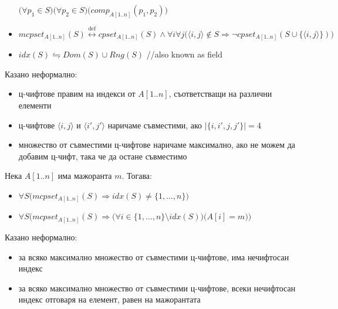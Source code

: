 \begin{solution}
\begin{boxlocaldefinition*}{}{}
\begin{itemize}
			\hspace{3.2cm}$\big(\forall p_1\in S\big)\big(\forall p_2\in S\big)\big(comp_{A[1..n]}(p_1,p_2)\big)$
			\item $mcpset_{A[1..n]}(S)\overset{\text{def}}\leftrightarrow cpset_{A[1..n]}(S)\land\forall i\forall j\big(\langle i,j\rangle\notin S\Rightarrow\lnot cpset_{A[1..n]}(S\cup\{\langle i,j\rangle\})\big)$
			\item $idx(S)\leftrightharpoons Dom(S)\cup Rng(S)$ //also known as field
		\end{itemize}
	\end{boxlocaldefinition*}
	\begin{remark*}
		Казано неформално:
		\begin{itemize}
			\item ц-чифтове правим на индекси от $A[1..n]$, съответстващи на различни елементи
			\item ц-чифтове $\langle i,j\rangle$ и $\langle i',j'\rangle$ наричаме съвместими, ако $|\{i,i',j,j'\}|=4$
			\item множество от съвместими ц-чифтове наричаме максимално, ако не можем да добавим ц-чифт, така че да остане съвместимо
		\end{itemize}
	\end{remark*}%
	\vspace{0.3cm}
	\begin{boxproposition}{}{}
		Нека $A[1..n]$ има мажоранта $m$. Тогава:
		\begin{itemize}
			\item $\forall S\big(mcpset_{A[1..n]}(S)\Rightarrow idx(S)\ne\{1,\dots,n\}\big)$
			\item $\forall S\Big(mcpset_{A[1..n]}(S)\Rightarrow\big(\forall i\!\in\!\{1,\dots,n\}\!\setminus\! idx(S)\big)\big(A[i]=m\big)\Big)$
		\end{itemize}
	\end{boxproposition}
	\begin{remark*}
		Казано неформално:
		\begin{itemize}
			\item за всяко максимално множество от съвместими ц-чифтове, има нечифтосан индекс
			\item за всяко максимално множество от съвместими ц-чифтове, всеки нечифтосан индекс отговаря на елемент, равен на мажорантата
		\end{itemize}
	\end{remark*}


\end{solution}
